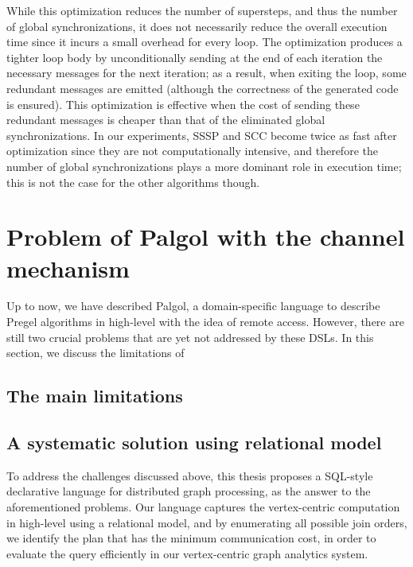 \documentclass{sokendai_thesis} %
\begin{document}
While this optimization reduces the number of supersteps, and thus the number of global synchronizations, it does not necessarily reduce the overall execution time since it incurs a small overhead for every loop.
The optimization produces a tighter loop body by unconditionally sending at the end of each iteration the necessary messages for the next iteration; as a result, when exiting the loop, some redundant messages are emitted (although the correctness of the generated code is ensured).
This optimization is effective when the cost of sending these redundant messages is cheaper than that of the eliminated global synchronizations.
In our experiments, SSSP and SCC become twice as fast after optimization since they are not computationally intensive, and therefore the number of global synchronizations plays a more dominant role in execution time; this is not the case for the other algorithms though.

\section{Problem of Palgol with the channel mechanism}

Up to now, we have described Palgol, a domain-specific language to describe Pregel algorithms in high-level with the idea of remote access.
However, there are still two crucial problems that are yet not addressed by these DSLs.
In this section, we discuss the limitations of

\subsection{The main limitations}

\subsection{A systematic solution using relational model}

To address the challenges discussed above, this thesis proposes a SQL-style declarative language for distributed graph processing, as the answer to the aforementioned problems.
Our language captures the vertex-centric computation in high-level using a relational model, and by enumerating all possible join orders, we identify the plan that has the minimum communication cost, in order to evaluate the query efficiently in our vertex-centric graph analytics system.
\end{document}
